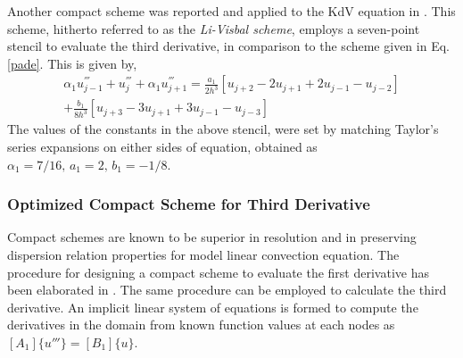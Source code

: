 Another compact scheme was reported and applied to the KdV equation in \cite{Li2006}. This scheme, hitherto referred to as the \textit{Li-Visbal scheme}, employs a seven-point stencil to evaluate the third derivative, in comparison to the scheme given in Eq. \eqref{pade}. This is given by,
\begin{equation}
\begin{aligned}
\label{eq:pade_li}
\alpha_1 u_{j-1}^{'''} +  u_{j}^{'''} + \alpha_1 u_{j+1}^{'''} 
= \frac{a_1}{2h^3}\left[u_{j+2}-2u_{j+1}+2u_{j-1}- u_{j-2}\right] \\
+ \frac{b_1}{8h^3}\left[u_{j+3}-3u_{j+1}+3u_{j-1}- u_{j-3}\right]
\end{aligned}
\end{equation}
The values of the constants in the above stencil, were set by matching Taylor's series expansions on either sides of equation, obtained as 
$\alpha_1 = 7/16,\,a_1= 2,\,b_1=-1/8$. 

\subsubsection{Optimized Compact Scheme for Third Derivative}
\label{subsec:OCS}
Compact schemes are known to be superior in resolution and in preserving dispersion relation properties for model linear convection equation. The procedure for designing a compact scheme to evaluate the first derivative has been elaborated in \cite{Sengupta2013a,Sengupta2006b}. The same procedure can be employed to calculate the third derivative. An implicit linear system of equations is formed to compute the derivatives in the domain from known function values at each nodes as $[A_1]\{u'''\} = [B_1]\{u\}$.

